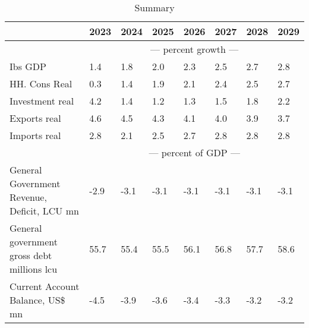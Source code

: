 \documentclass{article}
\begin{document}
\begin{table}
\caption{Summary}
\begin{tabular}{llllllll}
\toprule
 & 2023 & 2024 & 2025 & 2026 & 2027 & 2028 & 2029 \\
\midrule
&\multicolumn{7}{c}{--- percent growth ---}                                                                                                                                             \\
Ibs GDP &                  1.4 &                  1.8 &                  2.0 &                  2.3 &                  2.5 &                  2.7 &                  2.8 \\
HH. Cons Real &                  0.3 &                  1.4 &                  1.9 &                  2.1 &                  2.4 &                  2.5 &                  2.7 \\
Investment real &                  4.2 &                  1.4 &                  1.2 &                  1.3 &                  1.5 &                  1.8 &                  2.2 \\
Exports real &                  4.6 &                  4.5 &                  4.3 &                  4.1 &                  4.0 &                  3.9 &                  3.7 \\
Imports real &                  2.8 &                  2.1 &                  2.5 &                  2.7 &                  2.8 &                  2.8 &                  2.8 \\
&\multicolumn{7}{c}{--- percent of GDP ---}                                                                                                                                             \\
General Government Revenue, Deficit, LCU mn &                 -2.9 &                 -3.1 &                 -3.1 &                 -3.1 &                 -3.1 &                 -3.1 &                 -3.1 \\
General government gross debt millions lcu &                 55.7 &                 55.4 &                 55.5 &                 56.1 &                 56.8 &                 57.7 &                 58.6 \\
Current Account Balance, US\$ mn &                 -4.5 &                 -3.9 &                 -3.6 &                 -3.4 &                 -3.3 &                 -3.2 &                 -3.2 \\
\bottomrule
\end{tabular}
\end{table}
\end{document}
